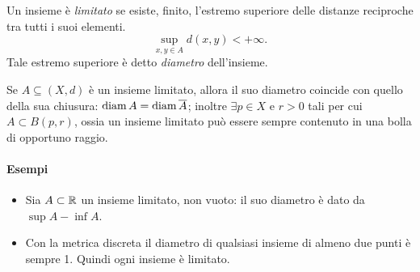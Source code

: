 \begin{definizione}
Un insieme è \emph{limitato} se esiste, finito, l'estremo superiore delle distanze reciproche tra tutti i suoi elementi.
\[
\sup_{x,y\in A} d(x,y)<+\infty.
\]
Tale estremo superiore è detto \emph{diametro} dell'insieme.
\end{definizione}
Se $A\subseteq (X,d)$ è un insieme limitato, allora il suo diametro coincide con quello della sua chiusura: $\operatorname{diam} A=\operatorname{diam}\overline{A}$; inoltre $\exists p\in X$ e $r>0$ tali per cui $A\subset B(p,r)$, ossia un insieme limitato può essere sempre contenuto in una bolla di opportuno raggio.
\paragraph{Esempi}
\begin{itemize}
\item Sia $A\subset\mathbb{R}$ un insieme limitato, non vuoto: il suo diametro è dato da $\sup A-\inf A$.
\item Con la metrica discreta il diametro di qualsiasi insieme di almeno due punti è sempre 1. Quindi ogni insieme è limitato.
\end{itemize}

